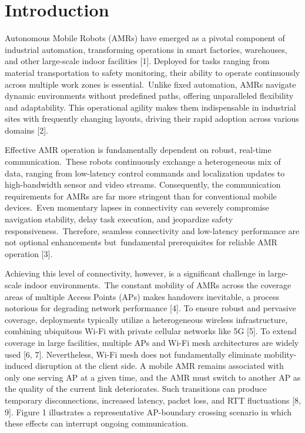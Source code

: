 \documentclass[preprint,11pt]{elsarticle}
\begin{document}
\section{Introduction}
Autonomous Mobile Robots (AMRs) have emerged as a pivotal component of industrial automation, transforming operations in smart factories, warehouses, and other large-scale indoor facilities [1]. Deployed for tasks ranging from material transportation to safety monitoring, their ability to operate continuously across multiple work zones is essential.~Unlike fixed automation, AMRs navigate dynamic environments without predefined paths, offering unparalleled flexibility and adaptability. This operational agility makes them indispensable in industrial sites with frequently changing layouts, driving their rapid adoption across various domains [2].

Effective AMR operation is fundamentally dependent on robust, real-time communication.~These robots continuously exchange a heterogeneous mix of data, ranging from low-latency control commands and localization updates to high-bandwidth sensor and video streams. Consequently, the communication requirements for AMRs are far more stringent than for conventional mobile devices.~Even momentary lapses in connectivity can severely compromise navigation stability, delay task execution, and jeopardize safety responsiveness.~Therefore, seamless connectivity and low-latency performance are not optional enhancements but~fundamental prerequisites for reliable AMR operation [3].

Achieving this level of connectivity, however, is a significant challenge in large-scale indoor environments.~The constant mobility of AMRs across the coverage areas of multiple Access Points (APs) makes handovers inevitable, a process notorious for degrading network performance [4]. To ensure robust and pervasive coverage, deployments typically utilize a heterogeneous wireless infrastructure, combining ubiquitous Wi-Fi with private cellular networks like 5G [5]. To extend coverage in large facilities, multiple APs and Wi-Fi mesh architectures are widely used [6, 7]. Nevertheless, Wi-Fi mesh does not fundamentally eliminate mobility-induced disruption at the client side. A mobile AMR remains associated with only one serving AP at a given time, and the AMR must switch to another AP as the quality of the current link deteriorates. Such transitions can produce temporary disconnections, increased latency, packet loss, and RTT fluctuations [8, 9]. Figure 1 illustrates a representative AP-boundary crossing scenario in which these effects can interrupt ongoing communication.
\end{document}
